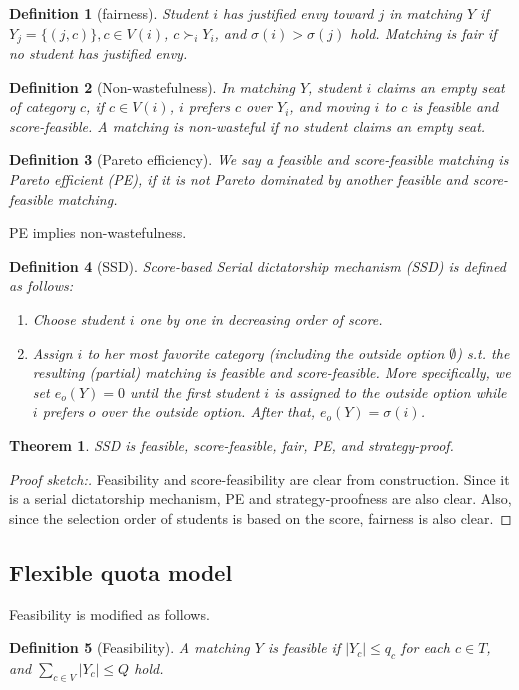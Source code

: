 \documentclass{article}
\newtheorem{theorem}{Theorem}
\newtheorem{definition}{Definition}
\begin{document}
\begin{definition}[fairness]
    Student $i$ has justified envy toward $j$ in matching $Y$
if $Y_j=\{(j, c)\}, c \in V(i)$, 
$c \succ_i Y_i$, and $\sigma(i)>\sigma(j)$ hold.
Matching is fair if no student has justified envy.
\end{definition}

\begin{definition}[Non-wastefulness]
In matching $Y$, student $i$ claims an empty seat of category $c$,
if $c \in V(i)$, $i$ prefers $c$ over $Y_i$, 
and moving $i$ to $c$ is feasible and score-feasible. 
A matching is non-wasteful if no student claims an empty seat.
\end{definition}

\begin{definition}[Pareto efficiency]
We say a feasible and score-feasible matching is Pareto efficient (PE), 
if it is not Pareto dominated by another feasible and score-feasible matching.
\end{definition}
PE implies non-wastefulness. 

\begin{definition}[SSD]
Score-based Serial dictatorship mechanism (SSD) is defined 
as follows:
\begin{enumerate}
    \item 
Choose student $i$ one by one in decreasing order of score.
\item Assign $i$ to her most favorite category (including the outside option $\emptyset$) 
s.t. the resulting (partial)
   matching is feasible and score-feasible. More specifically, 
   we set $e_o(Y)=0$ until the first student $i$ is assigned 
to the outside option while $i$ prefers $o$ over the outside option. 
After that, $e_o(Y)=\sigma(i)$. 
\end{enumerate}   
\end{definition}

\begin{theorem}
SSD is feasible, score-feasible, fair, PE, and strategy-proof.     
\end{theorem}
\begin{proof}[Proof sketch:]
Feasibility and score-feasibility are clear from construction. 
Since it is a serial dictatorship mechanism, PE and strategy-proofness are also clear. 
Also, since the selection order of students is based on the score, 
fairness is also clear. 
\end{proof}


\subsection{Flexible quota model}
Feasibility is modified as follows. 
\begin{definition}[Feasibility]
A matching $Y$ is feasible if 
    $|Y_c| \leq q_c$ for each $c \in T$, 
    and $\sum_{c \in V} |Y_c| \leq Q$ hold. 
\end{definition}
\end{document}
